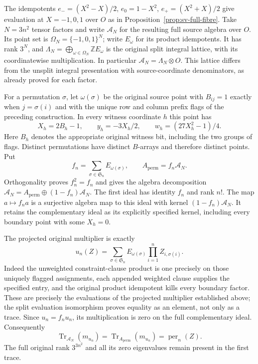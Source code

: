 The idempotents $e_-=(X^2-X)/2$, $e_0=1-X^2$,
$e_+=(X^2+X)/2$ give evaluation at $X=-1,0,1$ over $O$ as
in Proposition~\ref{prop:sv-full-fibre}. Take $N=3n^2$ tensor
factors and write $\mathcal A_N$ for the resulting full source
algebra over $O$. Its point set is $\Omega_N=\{-1,0,1\}^N$;
write $E_\omega$ for its product idempotents. It has rank $3^N$,
and $\Lambda_N=\bigoplus_{\omega\in\Omega_N}\mathbb Z E_\omega$
is the original split integral lattice, with its coordinatewise
multiplication. In particular $\mathcal A_N=\Lambda_N\otimes O$.
This lattice differs from the unsplit integral presentation with
source-coordinate denominators, as already proved for each factor.

For a permutation $\sigma$, let $\omega(\sigma)$ be the original
source point with $B_{ij}=1$ exactly when $j=\sigma(i)$ and with
the unique row and column prefix flags of the preceding construction.
In every witness coordinate $h$ this point has
\[
 X_h=2B_h-1,\qquad y_h=-3X_h/2,\qquad
 w_h=(27X_h^2-1)/4.
\]
Here $B_h$ denotes the appropriate original witness bit, including
the two groups of flags. Distinct permutations have distinct
$B$-arrays and therefore distinct points. Put
\[
 f_n=\sum_{\sigma\in\mathfrak S_n}E_{\omega(\sigma)},
 \qquad A_{\mathrm{perm}}=f_n\mathcal A_N.
\]
Orthogonality proves $f_n^2=f_n$ and gives the algebra decomposition
$\mathcal A_N=A_{\mathrm{perm}}\oplus(1-f_n)\mathcal A_N$.
The first ideal has identity $f_n$ and rank $n!$. The map
$a\mapsto f_na$ is a surjective algebra map to this ideal with
kernel $(1-f_n)\mathcal A_N$. It retains the complementary ideal
as its explicitly specified kernel, including every boundary point
with some $X_h=0$.

The projected original multiplier is exactly
\begin{equation}\label{eq:compressed-original-u}
 u_n(Z)=\sum_{\sigma\in\mathfrak S_n}
           E_{\omega(\sigma)}\prod_{i=1}^n Z_{i,\sigma(i)}.
\end{equation}
Indeed the unweighted constraint-clause product is one precisely on those uniquely
flagged assignments, each appended weighted clause supplies the
specified entry, and the original product idempotent kills every
boundary factor. These are precisely the evaluations of the
projected multiplier established above; the split evaluation
isomorphism proves equality as an element, not only as a trace.
Since $u_n=f_nu_n$, its multiplication is zero on the full
complementary ideal. Consequently
\[
 \operatorname{Tr}_{\mathcal A_N}(m_{u_n})
 =\operatorname{Tr}_{A_{\mathrm{perm}}}(m_{u_n})
 =\operatorname{per}_n(Z).
\]
The full original rank $3^{3n^2}$ and all its zero eigenvalues
remain present in the first trace.

